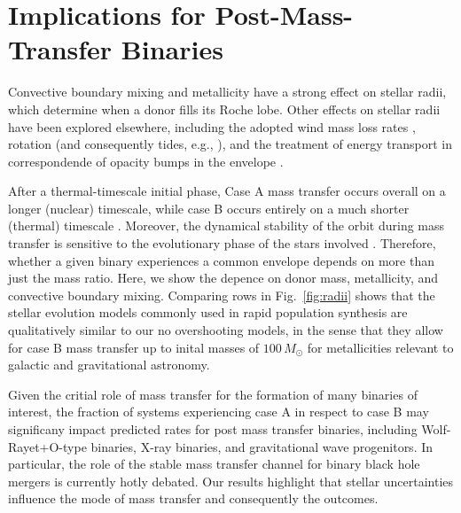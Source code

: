 \documentclass[twocolumn]{aastex63}
\DeclareRobustCommand{\Figref}[1]{Fig.~\ref{#1}}
\begin{document}
\section{Implications for Post-Mass-Transfer Binaries}

Convective boundary mixing \citep{brott:11, johnston:24} and
metallicity have a strong effect on stellar radii, which determine
when a donor fills its Roche lobe. Other effects on stellar radii have
been explored elsewhere, including the adopted wind mass loss rates
\citep[e.g.,][]{smith:14, renzo:17, josiek:24}, rotation (and
consequently tides, e.g., \citealt{maeder:00}), and the treatment of energy transport
in correspondende of opacity bumps in the envelope
\citep[e.g.,][]{joss:73, agrawal:22, cheng:24}.

After a thermal-timescale initial phase, Case A mass transfer occurs
overall on a longer (nuclear) timescale, while case B occurs entirely
on a much shorter (thermal) timescale \citep[but see][]{klencki:22}.
Moreover, the dynamical stability of the orbit during mass transfer is
sensitive to the evolutionary phase of the stars involved
\citep[e.g.,][]{claeys:14}. Therefore, whether a given binary
experiences a common envelope depends on more than just the mass
ratio. Here, we show the depence on donor mass, metallicity, and
convective boundary mixing. Comparing rows in \Figref{fig:radii} shows
that the stellar evolution models commonly used in rapid population
synthesis are qualitatively similar to our no overshooting models, in
the sense that they allow for case B mass transfer up to inital masses
of $100 \, M_{\odot}$ for metallicities relevant to galactic and
gravitational astronomy.

Given the critial role of mass transfer for the formation of many
binaries of interest, the fraction of systems experiencing case A in
respect to case B may significany impact predicted rates for post mass
transfer binaries, including Wolf-Rayet+O-type binaries, X-ray
binaries, and gravitational wave progenitors. In particular, the role
of the stable mass transfer channel \citep[e.g.,][]{marchant:21,
  vanson:22} for binary black hole mergers is currently hotly debated.
Our results highlight that stellar uncertainties influence the mode of
mass transfer and consequently the outcomes.



\end{document}
